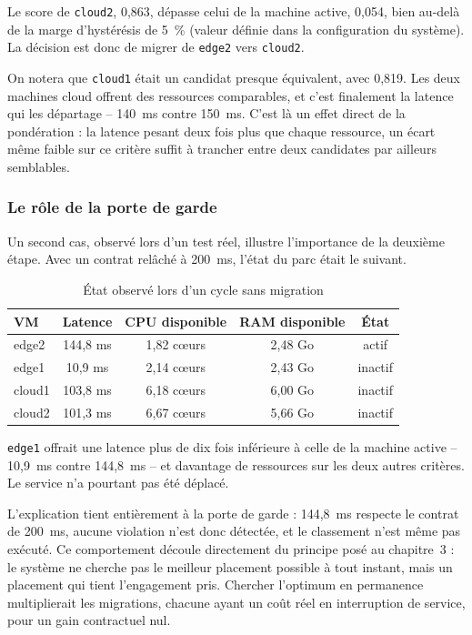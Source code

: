 Le score de \texttt{cloud2}, 0,863, dépasse celui de la machine active, 0,054, bien au-delà de la marge d'hystérésis de 5~\% (valeur définie dans la configuration du système). La décision est donc de migrer de \texttt{edge2} vers \texttt{cloud2}.

On notera que \texttt{cloud1} était un candidat presque équivalent, avec 0,819. Les deux machines cloud offrent des ressources comparables, et c'est finalement la latence qui les départage -- 140~ms contre 150~ms. C'est là un effet direct de la pondération : la latence pesant deux fois plus que chaque ressource, un écart même faible sur ce critère suffit à trancher entre deux candidates par ailleurs semblables.

\subsubsection{Le rôle de la porte de garde}

Un second cas, observé lors d'un test réel, illustre l'importance de la deuxième étape. Avec un contrat relâché à 200~ms, l'état du parc était le suivant.

\begin{table}[H]
    \centering
    \begin{tabular}{|l|c|c|c|c|}
        \hline
        \textbf{VM} & \textbf{Latence} & \textbf{CPU disponible} & \textbf{RAM disponible} & \textbf{État} \\
        \hline
        edge2 & 144,8 ms & 1,82 c\oe{}urs & 2,48 Go & actif \\
        \hline
        edge1 & 10,9 ms & 2,14 c\oe{}urs & 2,43 Go & inactif \\
        \hline
        cloud1 & 103,8 ms & 6,18 c\oe{}urs & 6,00 Go & inactif \\
        \hline
        cloud2 & 101,3 ms & 6,67 c\oe{}urs & 5,66 Go & inactif \\
        \hline
    \end{tabular}
    \caption{État observé lors d'un cycle sans migration}
    \label{tab:topsis-nonmigration}
\end{table}

\texttt{edge1} offrait une latence plus de dix fois inférieure à celle de la machine active -- 10,9~ms contre 144,8~ms -- et davantage de ressources sur les deux autres critères. Le service n'a pourtant pas été déplacé.

L'explication tient entièrement à la porte de garde : 144,8~ms respecte le contrat de 200~ms, aucune violation n'est donc détectée, et le classement n'est même pas exécuté. Ce comportement découle directement du principe posé au chapitre~3 : le système ne cherche pas le meilleur placement possible à tout instant, mais un placement qui tient l'engagement pris. Chercher l'optimum en permanence multiplierait les migrations, chacune ayant un coût réel en interruption de service, pour un gain contractuel nul.

